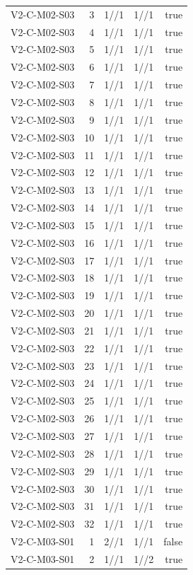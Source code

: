 {\begin{longtable}{lrrrr}
V2-C-M02-S03 & 3 & 1//1 & 1//1 & true \\
V2-C-M02-S03 & 4 & 1//1 & 1//1 & true \\
V2-C-M02-S03 & 5 & 1//1 & 1//1 & true \\
V2-C-M02-S03 & 6 & 1//1 & 1//1 & true \\
V2-C-M02-S03 & 7 & 1//1 & 1//1 & true \\
V2-C-M02-S03 & 8 & 1//1 & 1//1 & true \\
V2-C-M02-S03 & 9 & 1//1 & 1//1 & true \\
V2-C-M02-S03 & 10 & 1//1 & 1//1 & true \\
V2-C-M02-S03 & 11 & 1//1 & 1//1 & true \\
V2-C-M02-S03 & 12 & 1//1 & 1//1 & true \\
V2-C-M02-S03 & 13 & 1//1 & 1//1 & true \\
V2-C-M02-S03 & 14 & 1//1 & 1//1 & true \\
V2-C-M02-S03 & 15 & 1//1 & 1//1 & true \\
V2-C-M02-S03 & 16 & 1//1 & 1//1 & true \\
V2-C-M02-S03 & 17 & 1//1 & 1//1 & true \\
V2-C-M02-S03 & 18 & 1//1 & 1//1 & true \\
V2-C-M02-S03 & 19 & 1//1 & 1//1 & true \\
V2-C-M02-S03 & 20 & 1//1 & 1//1 & true \\
V2-C-M02-S03 & 21 & 1//1 & 1//1 & true \\
V2-C-M02-S03 & 22 & 1//1 & 1//1 & true \\
V2-C-M02-S03 & 23 & 1//1 & 1//1 & true \\
V2-C-M02-S03 & 24 & 1//1 & 1//1 & true \\
V2-C-M02-S03 & 25 & 1//1 & 1//1 & true \\
V2-C-M02-S03 & 26 & 1//1 & 1//1 & true \\
V2-C-M02-S03 & 27 & 1//1 & 1//1 & true \\
V2-C-M02-S03 & 28 & 1//1 & 1//1 & true \\
V2-C-M02-S03 & 29 & 1//1 & 1//1 & true \\
V2-C-M02-S03 & 30 & 1//1 & 1//1 & true \\
V2-C-M02-S03 & 31 & 1//1 & 1//1 & true \\
V2-C-M02-S03 & 32 & 1//1 & 1//1 & true \\
V2-C-M03-S01 & 1 & 2//1 & 1//1 & false \\
V2-C-M03-S01 & 2 & 1//1 & 1//2 & true \\

\end{longtable}}
